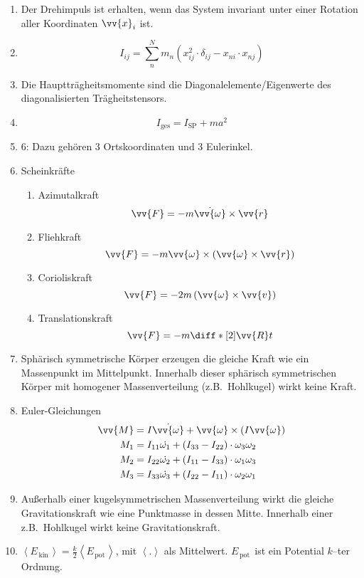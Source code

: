 \documentclass[a4paper,12pt]{article}
\numberwithin{equation}{section}
\begin{document}
\begin{enumerate}[label=\arabic*.]
        \item Der Drehimpuls ist erhalten, wenn das System invariant unter einer Rotation aller Koordinaten $\vv{x}_i$ ist.
        \item $$I_{ij}=\sum_{n}^{N} m_n \left( x_{ij}^2\cdot\delta_{ij}-x_{ni} \cdot x_{nj}\right)$$
        \item Die Hauptträgheitsmomente sind die Diagonalelemente/Eigenwerte des diagonalisierten Trägheitstensors.
        \item $$I_{\text{ges}}=I_{\text{SP}}+ma^2$$
        \item 6: Dazu gehören 3 Ortskoordinaten und 3 Eulerinkel.
        \item Scheinkräfte
        \begin{enumerate}[label=\alph*)]
                \item Azimutalkraft $$\vv{F} = -m\dot{\vv{\omega}} \times \vv{r}$$
                \item Fliehkraft $$\vv{F}= -m{\vv{\omega}} \times \left(\vv{\omega} \times \vv{r}\right) $$
                \item Corioliskraft $$\vv{F}= - 2m \left(\vv{\omega} \times \vv{v}\right)$$
                \item Translationskraft $$\vv{F}= -m \diff*[2]{\vv{R}}{t}$$
        \end{enumerate}
        \item Sphärisch symmetrische Körper erzeugen die gleiche Kraft wie ein Massenpunkt im Mittelpunkt. Innerhalb dieser sphärisch symmetrischen Körper mit homogener Massenverteilung (z.B.\ Hohlkugel) wirkt keine Kraft.
        \item Euler-Gleichungen
        \begin{align*}
                \vv{M} &= I \dot{\vv{\omega}} + \vv{\omega} \times (I \vv{\omega})\\
                M_1 &= I_{11} \dot{\omega_1} + (I_{33}-I_{22})\cdot \omega_3 \omega_2\\
                M_2 &= I_{22} \dot{\omega_2} + (I_{11}-I_{33})\cdot \omega_1 \omega_3\\
                M_3 &= I_{33} \dot{\omega_3} + (I_{22}-I_{11})\cdot \omega_2 \omega_1
        \end{align*}
        \item Außerhalb einer kugelsymmetrischen Massenverteilung wirkt die gleiche Gravitationskraft wie eine Punktmasse in dessen Mitte. Innerhalb einer z.B.\ Hohlkugel wirkt keine Gravitationskraft.
        \item $\left\langle E_{\,\text{kin}\,}\right\rangle =\tfrac{k}{2}\left\langle E_{\,\text{pot}\,}\right\rangle $, mit $\left\langle .\right\rangle $ als Mittelwert. $E_{\,\text{pot}\,}$ ist ein Potential $k$--ter Ordnung.
\end{enumerate}
\end{document}
